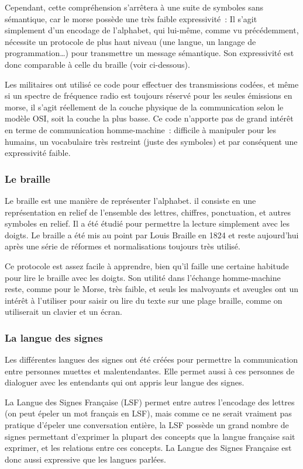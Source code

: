 \documentclass[french,a4paper]{article}
\begin{document}
Cependant, cette compréhension s'arrêtera à une suite de symboles
sans sémantique, car le morse possède une très faible expressivité~:
Il s'agit simplement d'un encodage de l'alphabet, qui lui-même, comme
vu précédemment, nécessite un protocole de plus haut niveau (une
langue, un langage de programmation…) pour transmettre un message
sémantique. Son expressivité est donc comparable à celle du braille
(voir ci-dessous).

Les militaires ont utilisé ce code pour effectuer des transmissions
codées, et même si un spectre de fréquence radio est toujours réservé
pour les seules émissions en morse, il s'agit réellement de la couche
physique de la communication selon le modèle OSI, soit la couche la
plus basse. Ce code n'apporte pas de grand intérêt en terme de
communication homme-machine~: difficile à manipuler pour les humains,
un vocabulaire très restreint (juste des symboles) et par conséquent
une expressivité faible.

\subsubsection{Le braille}
Le braille est une manière de représenter l'alphabet. il consiste en
une représentation en relief de l'ensemble des lettres, chiffres,
ponctuation, et autres symboles en relief. Il a été étudié pour
permettre la lecture simplement avec les doigts. Le braille a été mis
au point par Louis Braille en 1824 et reste aujourd'hui après une
série de réformes et normalisations toujours très utilisé.

Ce protocole est assez facile à apprendre, bien qu'il faille une
certaine habitude pour lire le braille avec les doigts. Son utilité
dans l'échange homme-machine reste, comme pour le Morse, très faible,
et seuls les malvoyants et aveugles ont un intérêt à l'utiliser pour
saisir ou lire du texte sur une plage braille, comme on utiliserait un
clavier et un écran.

\subsubsection{La langue des signes}
Les différentes langues des signes ont été créées pour permettre la
communication entre personnes muettes et malentendantes. Elle permet
aussi à ces personnes de dialoguer avec les entendants qui ont appris
leur langue des signes.

La Langue des Signes Française (LSF) permet entre autres l'encodage
des lettres (on peut épeler un mot français en LSF), mais comme ce ne
serait vraiment pas pratique d'épeler une conversation entière, la
LSF possède un grand nombre de signes permettant d'exprimer la plupart
des concepts que la langue française sait exprimer, et les relations
entre ces concepts. La Langue des Signes Française est donc aussi
expressive que les langues parlées.
\end{document}
